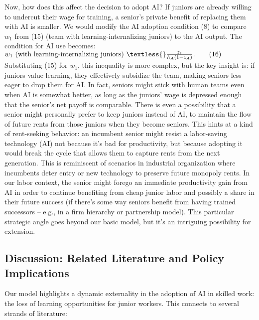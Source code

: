 \documentclass[12pt]{article}
\begin{document}
Now, how does this affect the decision to adopt AI? If juniors are
already willing to undercut their wage for training, a senior's private
benefit of replacing them with AI is smaller. We would modify the
{AI adoption condition} (8) to compare \(w_1\) from (15) (team
with learning-internalizing juniors) to the AI output. The condition for
AI use becomes: $ w_1 \text{ (with learning-internalizing juniors) }
\textless{} \frac{z_1}{h_A(1-z_A)}. \tag{16}$ Substituting (15) for
\(w_1\), this inequality is more complex, but the key insight is:
{if juniors value learning, they effectively subsidize the team,
making seniors less eager to drop them for AI}. In fact, seniors might
stick with human teams even when AI is somewhat better, as long as the
juniors' wage is depressed enough that the senior's net payoff is
comparable. There is even a possibility that a {senior might
{personally prefer} to keep juniors instead of AI}, to maintain the
flow of future rents from those juniors when they become seniors. This
hints at a kind of {rent-seeking behavior}: an incumbent senior
might resist a labor-saving technology (AI) not because it's bad for
productivity, but because adopting it would break the cycle that allows
them to capture rents from the next generation. This is reminiscent of
scenarios in industrial organization where incumbents deter entry or new
technology to preserve future monopoly rents. In our labor context, the
senior might forego an immediate productivity gain from AI in order to
continue benefiting from cheap junior labor and possibly a share in
their future success (if there's some way seniors benefit from having
trained successors -- e.g., in a firm hierarchy or partnership model).
This particular strategic angle goes beyond our basic model, but it's an
intriguing possibility for extension.

\subsection{Discussion: Related Literature and Policy
Implications}\label{discussion-related-literature-and-policy-implications}

Our model highlights a {dynamic externality} in the adoption of
AI in skilled work: the loss of learning opportunities for junior
workers. This connects to several strands of literature:
\end{document}
